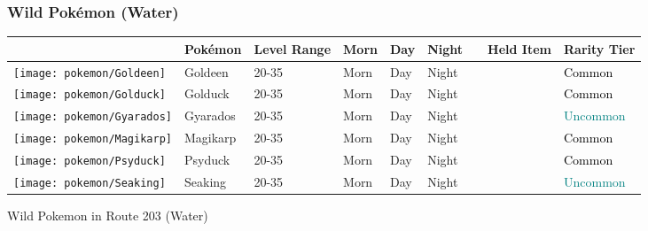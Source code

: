 \subsubsection{Wild Pokémon (Water)}%
\label{ssubsec:WildPokmon(Water)}%
\begin{longtable}{||l l l l l l l l l||}%
\hline%
&Pokémon&Level Range&Morn&Day&Night&&Held Item&Rarity Tier\\%
\hline%
\endhead%
\hline%
\texttt{[image: pokemon/Goldeen]}&Goldeen&20{-}35&Morn&Day&Night&&&\textcolor{black}{%
Common%
}\\%
\hline%
\texttt{[image: pokemon/Golduck]}&Golduck&20{-}35&Morn&Day&Night&&&\textcolor{black}{%
Common%
}\\%
\hline%
\texttt{[image: pokemon/Gyarados]}&Gyarados&20{-}35&Morn&Day&Night&&&\textcolor{teal}{%
Uncommon%
}\\%
\hline%
\texttt{[image: pokemon/Magikarp]}&Magikarp&20{-}35&Morn&Day&Night&&&\textcolor{black}{%
Common%
}\\%
\hline%
\texttt{[image: pokemon/Psyduck]}&Psyduck&20{-}35&Morn&Day&Night&&&\textcolor{black}{%
Common%
}\\%
\hline%
\texttt{[image: pokemon/Seaking]}&Seaking&20{-}35&Morn&Day&Night&&&\textcolor{teal}{%
Uncommon%
}\\%
\hline%
\end{longtable}%
\caption{Wild Pokemon in Route 203 (Water)}